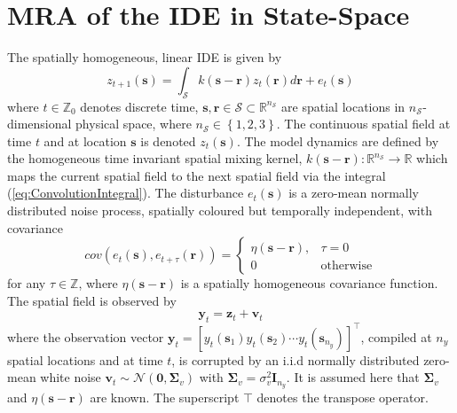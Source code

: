 \documentclass[11pt,draftcls,onecolumn,peerreview]{IEEEtran}
\begin{document}
\section{MRA of the IDE in State-Space}
The spatially homogeneous, linear IDE is given by
\begin{equation}
 z_{t+1}\left(\mathbf{s}\right)=\int_{\mathcal{S}}k\left(\mathbf{s}-\mathbf{r}\right)z_{t}\left(\mathbf{r}\right)d\mathbf{r}+e_{t}\left(\mathbf{s}\right)
\label{eq:ConvolutionIntegral}
\end{equation}
where $t\in \mathbb{Z}_0 $ denotes discrete time, $\mathbf{s},\mathbf{r} \in \mathcal{S} \subset \mathbb{R}^{n_\mathcal{S}}$ are spatial locations in $n_{\mathcal S}$-dimensional physical space, where $n_{\mathcal S} \in \left\lbrace 1,2,3 \right\rbrace $. The continuous spatial field at time $t$ and at location $\mathbf s$ is denoted $z_t\left(\mathbf s\right)$. The model dynamics  are defined by the homogeneous time invariant spatial mixing kernel, $k\left(\mathbf{s}-\mathbf{r}\right):\mathbb{R}^{n_\mathcal{S}}\rightarrow \mathbb{R}$ which maps the current spatial field to the next spatial field via the integral (\ref{eq:ConvolutionIntegral}). The disturbance $e_{t}(\mathbf{s})$ is a zero-mean normally distributed noise process, spatially coloured but temporally independent, with covariance 
\begin{equation}
cov\left(e_{t}\left(\mathbf{s}\right),e_{t+\tau}\left(\mathbf{r}\right)\right)=
\begin{cases}
\eta\left(\mathbf{s}-\mathbf{r}\right), & \tau=0 \\
0 & \mathrm{otherwise}
\end{cases}
\label{eq:FieldCovariance}
\end{equation}
for any $\tau \in \mathbb{Z}$, where $\eta\left(\mathbf s-\mathbf r \right)$ is a  spatially homogeneous covariance function. The spatial field is observed by
\begin{equation}
 \mathbf{y}_{t}=\mathbf{z}_{t}+\mathbf{v}_t
\label{eq:observation equation}
\end{equation}
where the observation vector $\mathbf{y}_{t}=[y_t(\mathbf{s}_1) y_t(\mathbf{s}_2)\cdots y_t(\mathbf{s}_{n_y})]^\top$, compiled at $n_{y}$ spatial locations and at time $t$, is corrupted by an i.i.d normally distributed zero-mean white noise $\mathbf{v}_{t}\sim \mathcal{N}\left(\mathbf{0},\mathbf{\Sigma}_{v}\right)$ with $\mathbf{\Sigma}_{v}=\sigma_v^2\mathbf I_{n_y} $. It is assumed here that $\boldsymbol\Sigma_v$ and $\eta\left(\mathbf s-\mathbf r \right)$ are known. The superscript $\top$ denotes the transpose operator.
\end{document}
